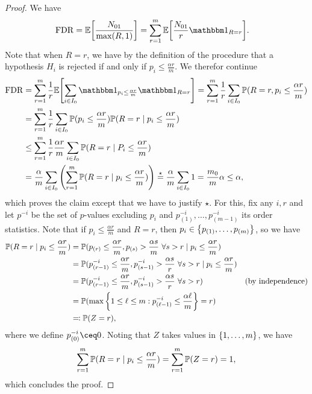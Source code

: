 \begin{example}
\begin{proof}
	We have
	\begin{align*}
		\FDR &= \EE\qty[ \frac{N_{01}}{\max(R, 1)}] = \sum_{r=1}^m \EE\qty[\frac{N_{01}}{r} \ind_{R = r}].
	\end{align*}
	Note that when $R = r$, we have by the definition of the procedure that a hypothesis $H_i$ is rejected if and only if $p_i \leq \frac{\alpha r}{m}$.  We therefor continue
	\begin{align*}
		\FDR &= \sum_{r=1}^m \frac 1r \EE\qty[ \sum_{i \in I_0} \ind_{p_i \leq \frac{\alpha r}{m}} \ind_{R = r}]  = \sum_{r=1}^m \frac1r \sum_{i \in I_0} \PP(R = r, p_i \leq \frac{\alpha r}{m}) \\
		&= \sum_{r=1}^m  \frac1r \sum_{i \in I_0} \PP(p_i \leq \frac{\alpha r}{m}) \PP(R = r \mid p_i \leq \frac{\alpha r}{m}) \\
		&\leq \sum_{r=1}^m \frac1r \frac{\alpha r}{m} \sum_{i \in I_0} \PP(R = r \mid P_i \leq \frac{\alpha r}{m})  \\
		&= \frac\alpha m \sum_{i \in I_0} \qty(\sum_{r=1}^m \PP(R = r \mid p_i \leq \frac{\alpha r}{m})) \overset\star= \frac\alpha m \sum_{i \in I_0} 1 = \frac{m_0}{m}\alpha \leq \alpha, 
	\end{align*}
	which proves the claim except that we have to justify $\star$. For this, fix any $i, r$ and let $p^{-i}$ be the set of $p$-values excluding $p_i$ and $p^{-i}_{(1)}, \dotsc, p^{-i}_{(m-1)}$ its order statistics. Note that if $p_i \leq \frac{\alpha r}{m}$ and $R = r$, then $p_i \in \qty{p_{(1)}, \dotsc, p_{(m)}}$, so we have
	\begin{align*}
		\mathbb P(R = r \mid p_i \leq \frac{\alpha r}{m}) &= \mathbb P(p_{(r)} \leq \frac{\alpha r}{m}, p_{(s)} > \frac{\alpha s}{m} \ \forall s > r \mid p_i \leq \frac{\alpha r}{m}) \\
		&= \mathbb P(p^{-i}_{(r-1)} \leq \frac{\alpha r}{m}, p^{-i}_{(s-1)} > \frac{\alpha s}{r} \ \forall s > r \mid p_i \leq \frac{\alpha r }{m}) \\
		&= \mathbb P(p^{-i}_{(r-1)} \leq \frac{\alpha r}{m}, p^{-i}_{(s-1)} > \frac{\alpha s}{r} \ \forall s > r) &\text{(by independence)} \\
		&= \mathbb P(\max \qty{1 \leq \ell \leq m : p_{(\ell -1 )}^{-i} \leq \frac{\alpha \ell}{m}} = r) \\
		&\eqqcolon \mathbb P(Z = r),
	\end{align*}
	where we define $p_{(0)}^{-i} \ceq 0$. Noting that $Z$ takes values in $\qty{1, \dotsc, m}$, we have
	\[
	\sum_{r=1}^m \mathbb P(R = r \mid p_i \leq \frac{\alpha r}{m}) = \sum_{r = 1}^m \mathbb P(Z =r) = 1,
	\]
	which concludes the proof.
\end{proof}
\end{example}

